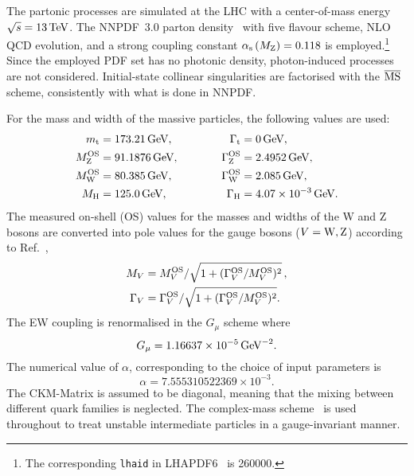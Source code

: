 The partonic processes are simulated at the LHC with a center-of-mass energy $\sqrt s = 13 \,\text{TeV}$.
The NNPDF~3.0 parton density~\cite{Ball:2014uwa} with five flavour scheme, NLO QCD evolution, and a strong coupling constant $\alpha_\text{s}\left( M_\text{Z} \right) = 0.118$ is employed.\footnote{The corresponding {\tt lhaid} in LHAPDF6~\cite{Buckley:2014ana} is 260000.}
Since the employed PDF set has no photonic density, photon-induced processes are not considered.
Initial-state collinear singularities are factorised with the ${\overline{\rm MS}}$ scheme, consistently with what is done in NNPDF.

For the mass and width of the massive particles, the following values are used:
%
\begin{alignat}{2}
                  m_\text{t}   &=  173.21\,\text{GeV},       & \quad \quad \quad \Gamma_\text{t} &= 0 \,\text{GeV},  \nonumber \\
                M_\text{Z}^\text{OS} &=  91.1876\,\text{GeV},      & \quad \quad \quad \Gamma_\text{Z}^\text{OS} &= 2.4952\,\text{GeV},  \nonumber \\
                M_\text{W}^\text{OS} &=  80.385\,\text{GeV},       & \Gamma_\text{W}^\text{OS} &= 2.085\,\text{GeV},  \nonumber \\
                M_{\rm H} &=  125.0\,\text{GeV},       &  \Gamma_\text{H}   &=  4.07 \times 10^{-3}\,\text{GeV}.
\end{alignat}
%
The measured on-shell (OS) values for the masses and widths of the W and Z bosons are converted into pole values for the gauge bosons ($V=\text{W},\text{Z}$) according to Ref.~\cite{Bardin:1988xt},
%
\begin{equation}
\begin{split}
        M_V &= M_{V}^\text{OS}/\sqrt{1+(\Gamma_{V}^\text{OS}/M_{V}^\text{OS})^2}\,, \\
   \Gamma_V &= \Gamma_{V}^\text{OS}/\sqrt{1+(\Gamma_{V}^\text{OS}/M_{V}^\text{OS})^2}.
\end{split}
\end{equation}
%
The EW coupling is renormalised in the $G_\mu$ scheme \cite{Denner:2000bj} where
%
\begin{equation}
    G_{\mu}    = 1.16637\times 10^{-5}\,\text{GeV}^{-2}.
\end{equation}
%
The numerical value of $\alpha$, corresponding to the choice of input parameters is
%
\begin{equation}
 \alpha = 7.555310522369 \times 10^{-3}.
\end{equation}
The CKM-Matrix is assumed to be diagonal, meaning that the mixing between different quark families is neglected.
The complex-mass scheme~\cite{Denner:1999gp,Denner:2005fg,Denner:2006ic} is used throughout to treat unstable intermediate particles in a gauge-invariant manner.


